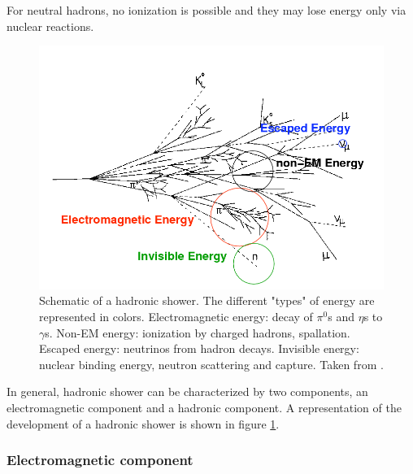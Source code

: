 For neutral hadrons, no ionization is possible and they may lose energy only via nuclear reactions.
\begin{figure}[htbp!]
  \centering
  \includegraphics[width=0.7\linewidth]{chap2/fig/images_had-shower.png}
  \caption{Schematic of a hadronic shower. The different "types" of energy are represented in colors. Electromagnetic energy: decay of $\pi^0$s and $\eta$s to $\gamma$s. Non-EM energy: ionization by charged hadrons, spallation. Escaped energy: neutrinos from hadron decays. Invisible energy: nuclear binding energy, neutron scattering and capture. Taken from \cite{Grahn:2009ki}.} \label{fig:HadShower}
\end{figure}

In general, hadronic shower can be characterized by two components, an electromagnetic component and a hadronic component. A representation of the development of a hadronic shower is shown in figure \ref{fig:HadShower}.

\subsubsection{Electromagnetic component}

